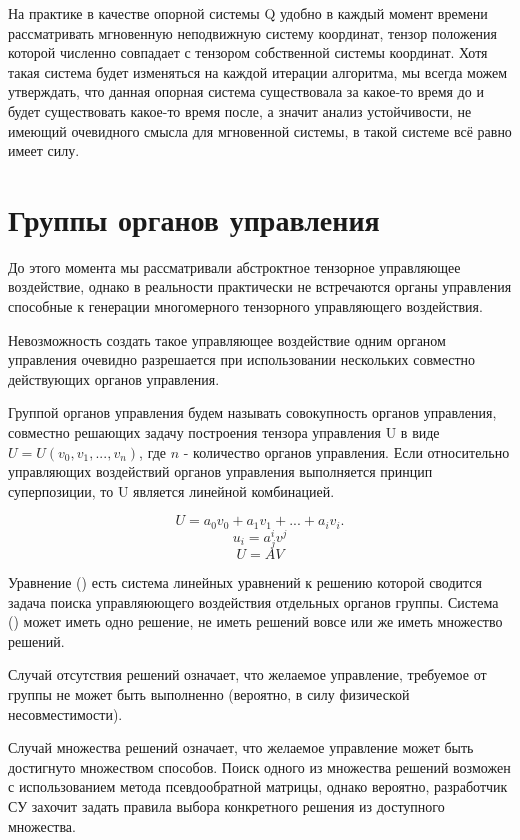 \documentclass[a4paper]{article}
\begin{document}
На практике в качестве опорной системы Q удобно в каждый момент времени рассматривать мгновенную неподвижную систему координат, тензор положения которой численно совпадает с тензором собственной системы координат. Хотя такая система будет изменяться на каждой итерации алгоритма, мы всегда можем утверждать, что данная опорная система существовала за какое-то время до и будет существовать какое-то время после, а значит анализ устойчивости, не имеющий очевидного смысла для мгновенной системы, в такой системе всё равно имеет силу. 

\section{Группы органов управления}
До этого момента мы рассматривали абстроктное тензорное управляющее воздействие, однако в реальности практически не встречаются органы управления способные к генерации многомерного тензорного управляющего воздействия.

Невозможность создать такое управляющее воздействие одним органом управления очевидно разрешается при использовании нескольких совместно действующих органов управления.

Группой органов управления будем называть совокупность органов управления, совместно решающих задачу построения тензора управления U в виде $U = U(v_0, v_1, ..., v_n)$, где $n$ - количество органов управления. Если относительно управляющих воздействий органов управления выполняется принцип суперпозиции, то U является линейной комбинацией. 

\begin{equation}U = a_0v_0 + a_1v_1 + ... + a_iv_i.\end{equation}
\begin{equation}u_i=a^i_jv^j\end{equation}
\begin{equation}U = AV\end{equation}

Уравнение () есть система линейных уравнений к решению которой сводится задача поиска управляюющего воздействия отдельных органов группы. Система () может иметь одно решение, не иметь решений вовсе или же иметь множество решений.

Случай отсутствия решений означает, что желаемое управление, требуемое от группы не может быть выполненно (вероятно, в силу физической несовместимости). 

Случай множества решений означает, что желаемое управление может быть достигнуто множеством способов. 
Поиск одного из множества решений возможен с использованием метода псевдообратной матрицы, однако вероятно, разработчик СУ захочит задать правила выбора конкретного решения из доступного множества.
\end{document}
